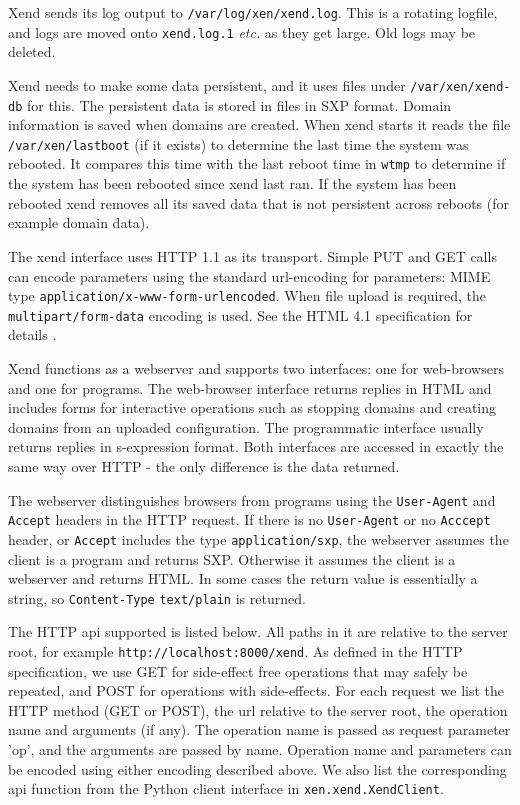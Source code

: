 \documentclass[11pt,twoside,final,openright]{report}
\begin{document}
Xend sends its log output to {\tt /var/log/xen/xend.log}. This is a rotating logfile,
and logs are moved onto {\tt xend.log.1} {\it etc.} as they get large. Old logs may
be deleted.

Xend needs to make some data persistent, and it uses files under {\tt /var/xen/xend-db}
for this. The persistent data is stored in files in SXP format. Domain information
is saved when domains are created. When xend starts it reads the file {\tt /var/xen/lastboot}
(if it exists) to determine the last time the system was rebooted. It compares this time
with the last reboot time in {\tt wtmp} to determine if the system has been rebooted
since xend last ran. If the system has been rebooted xend removes all its saved data
that is not persistent across reboots (for example domain data).

 The xend interface uses HTTP 1.1 \cite{http} as its transport.
Simple PUT and GET calls can encode parameters using the standard url-encoding 
for parameters: MIME type {\tt application/x-www-form-urlencoded}.
When file upload is required, the {\tt multipart/form-data} encoding is used.
See the HTML 4.1 specification for details \cite{html}.

Xend functions as a webserver and supports two interfaces: one
for web-browsers and one for programs.
The web-browser interface returns replies in HTML and includes forms
for interactive operations such as stopping domains and creating domains
from an uploaded configuration. The programmatic interface usually returns replies
in s-expression format. Both interfaces are accessed
in exactly the same way over HTTP - the only difference is the data returned.

The webserver distinguishes browsers from programs using the {\tt User-Agent}
and {\tt Accept} headers in the HTTP request. If there is no {\tt User-Agent} or no
{\tt Acccept} header, or {\tt Accept} includes the type {\tt application/sxp}, the
webserver assumes the client is a program and returns SXP. Otherwise
it assumes the client is a webserver and returns HTML.
In some cases the return value is essentially a string, so {\tt Content-Type}
{\tt text/plain} is returned.

The HTTP api supported is listed below. All paths in it are relative to the
server root, for example {\tt http://localhost:8000/xend}.
As defined in the HTTP specification, we use GET for side-effect free
operations that may safely be repeated, and POST for operations with
side-effects. For each request we list the HTTP method (GET or POST),
the url relative to the server root, the operation name and arguments (if any).
The operation name is passed as request parameter 'op', and the arguments
are passed by name. Operation name and parameters can be encoded using either
encoding described above. We also list the corresponding api function from the
Python client interface in {\tt xen.xend.XendClient}.
\end{document}
